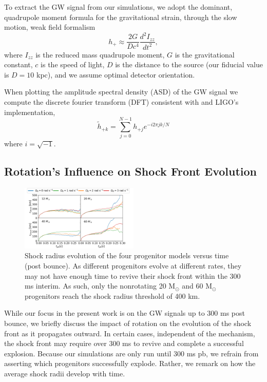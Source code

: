 \documentclass[twocolumn,times]{aastex62}  %
\newcommand{\Msun}{\ensuremath{\mathrm{M}_\odot}\xspace}
\begin{document}
To extract the GW signal from our simulations, we adopt the dominant, quadrupole moment formula for the gravitational strain, through the slow motion, weak field formalism %
\citep[eg.][]{finn:1990,blanchet:1990}
\begin{equation}
    h_+ \approx \frac{2G}{Dc^4}
    \frac{d^2I_{zz}}{dt^2},
\label{eq:quad}
\end{equation}
where $I_{zz}$ is the reduced mass quadrupole moment, $G$ is the gravitational constant, $c$ is the speed of light, $D$ is the distance to the source (our fiducial value is $D=10$ kpc), and we assume optimal detector orientation.\\
\par When plotting the amplitude spectral density (ASD) of the GW signal we compute the discrete fourier transform (DFT) consistent with \citet{anderson:2004} and LIGO's implementation,
\begin{equation}
\widetilde{h}_{+k} = \sum^{N-1}_{j=0} h_{+j} e^{-i2\pi jk/N}
\label{eq:dft}
\end{equation}
where $i=\sqrt{-1}$.

\subsection{Rotation's Influence on Shock Front Evolution}

\begin{figure}[t]
    \centering
    \includegraphics[width = 0.5\textwidth]{figures/M1_shock_mass.pdf}
    \caption{Shock radius evolution of the four progenitor models versus time (post bounce).  As different progenitors evolve at different rates, they may not have enough time to revive their shock front within the 300 ms interim.  As such, only the nonrotating 20 \Msun and 60 \Msun progenitors reach the shock radius threshold of 400 km. }
    \label{fig:shock}
\end{figure} 

While our focus in the present work is on the GW signals up to 300 ms post bounce, we briefly discuss the impact of rotation on the evolution of the shock front as it propagates outward.  In certain cases, independent of the mechanism, the shock front may require over 300 ms to revive and complete a successful explosion.  Because our simulations are only run until 300 ms pb, we refrain from asserting which progenitors successfully explode.  Rather, we remark on how the average shock radii develop with time.
\end{document}
